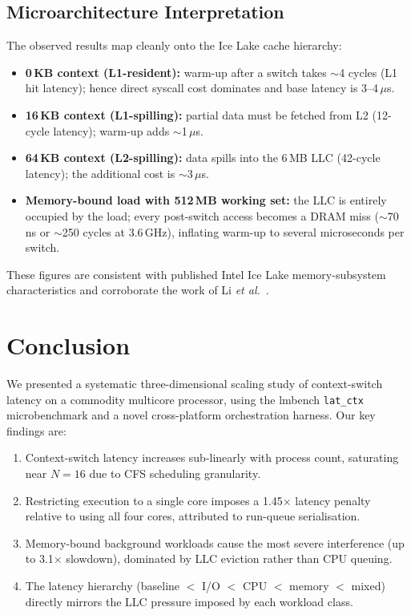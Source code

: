 \documentclass[conference]{IEEEtran}
\begin{document}
\subsection{Microarchitecture Interpretation}

The observed results map cleanly onto the Ice Lake cache hierarchy:

\begin{itemize}
  \item \textbf{0\,KB context (L1-resident):} warm-up after a switch takes
        $\sim$4 cycles (L1 hit latency); hence direct syscall cost dominates
        and base latency is 3--4\,$\mu$s.
  \item \textbf{16\,KB context (L1-spilling):} partial data must be fetched
        from L2 (12-cycle latency); warm-up adds $\sim$1\,$\mu$s.
  \item \textbf{64\,KB context (L2-spilling):} data spills into the 6\,MB LLC
        (42-cycle latency); the additional cost is $\sim$3\,$\mu$s.
  \item \textbf{Memory-bound load with 512\,MB working set:} the LLC is
        entirely occupied by the load; every post-switch access becomes a DRAM
        miss ($\sim$70\,ns or $\sim$250 cycles at 3.6\,GHz), inflating
        warm-up to several microseconds per switch.
\end{itemize}

These figures are consistent with published Intel Ice Lake memory-subsystem
characteristics and corroborate the work of Li \textit{et al.}~\cite{li2007quantifying}.

\section{Conclusion}
\label{sec:conclusion}

We presented a systematic three-dimensional scaling study of context-switch
latency on a commodity multicore processor, using the lmbench
\texttt{lat\_ctx} microbenchmark and a novel cross-platform orchestration
harness.  Our key findings are:

\begin{enumerate}
  \item Context-switch latency increases sub-linearly with process count,
        saturating near $N{=}16$ due to CFS scheduling granularity.
  \item Restricting execution to a single core imposes a 1.45$\times$ latency
        penalty relative to using all four cores, attributed to run-queue
        serialisation.
  \item Memory-bound background workloads cause the most severe interference
        (up to 3.1$\times$ slowdown), dominated by LLC eviction rather than
        CPU queuing.
  \item The latency hierarchy (baseline $<$ I/O $<$ CPU $<$ memory $<$ mixed)
        directly mirrors the LLC pressure imposed by each workload class.
\end{enumerate}
\end{document}

